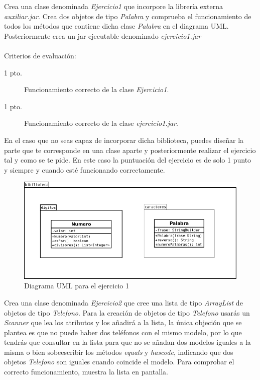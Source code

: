 \documentclass[addpoints,12pt]{exam}
\begin{document}
\begin{questions}
\question Crea una clase denominada \emph{Ejercicio1} que incorpore la librería externa \emph{auxiliar.jar}. Crea dos objetos de tipo \emph{Palabra} y comprueba el funcionamiento de todos los métodos que contiene dicha clase \emph{Palabra} en el diagrama UML.
\\
Posteriormente crea un jar ejecutable denominado \emph{ejercicio1.jar}\\
\vspace{0.3cm}
\\
Criterios de evaluación:
\begin{description}
\item[1 pto.] Funcionamiento correcto de la clase \emph{Ejercicio1}.
\item[1 pto.] Funcionamiento correcto de la clase \emph{ejercicio1.jar}.
\end{description}
En el caso que no seas capaz de incorporar dicha biblioteca, puedes diseñar la parte que te corresponde en una clase aparte y posteriormente realizar el ejercicio tal y como se te pide. En este caso la puntuación del ejercicio es de solo 1 punto y siempre y cuando esté funcionando correctamente. 
\begin{figure}[h]
\centering
\includegraphics[scale=0.3]{examen.png}
\caption{Diagrama UML para el ejercicio 1}
\end{figure}
\question Crea una clase denominada \emph{Ejercicio2} que cree una lista de tipo \emph{ArrayList} de objetos de tipo \emph{Telefono}. Para la creación de objetos de tipo \emph{Telefono} usarás un \emph{Scanner} que lea los atributos y los añadirá a la lista, la única objeción que se plantea es que no puede haber dos teléfonos con el mismo modelo, por lo que tendrás que consultar en la lista para que no se añadan dos modelos iguales a la misma o bien sobeescribir los métodos \emph{equals} y \emph{hascode}, indicando que dos objetos \emph{Telefono} son iguales cuando coincide el modelo. Para comprobar el correcto funcionamiento, muestra la lista en pantalla.\\

\end{questions}
\end{document}
